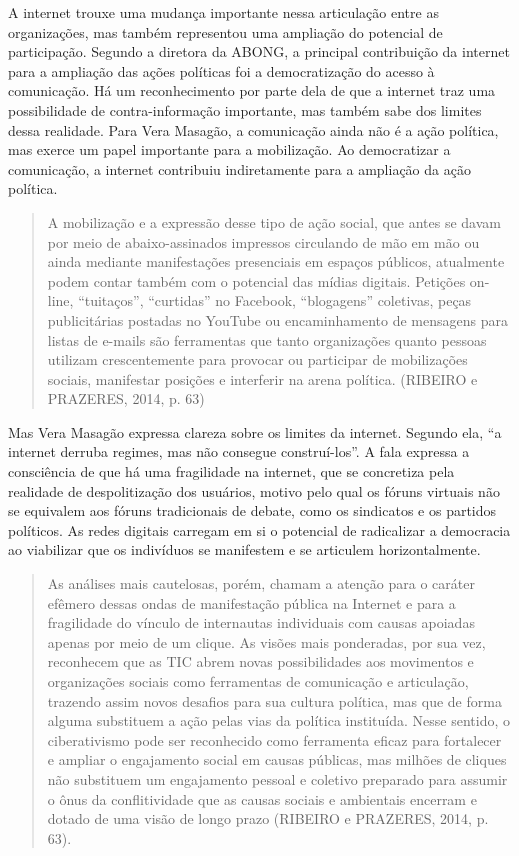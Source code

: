 A internet trouxe uma mudança importante nessa articulação entre as
organizações, mas também representou uma ampliação do potencial de
participação. Segundo a diretora da ABONG, a principal contribuição da
internet para a ampliação das ações políticas foi a democratização do
acesso à comunicação. Há um reconhecimento por parte dela de que a
internet traz uma possibilidade de contra-informação importante, mas
também sabe dos limites dessa realidade. Para Vera Masagão, a
comunicação ainda não é a ação política, mas exerce um papel importante
para a mobilização. Ao democratizar a comunicação, a internet contribuiu
indiretamente para a ampliação da ação política.

\begin{quote}
A mobilização e a expressão desse tipo de ação social, que antes se
davam por meio de abaixo-assinados impressos circulando de mão em mão ou
ainda mediante manifestações presenciais em espaços públicos, atualmente
podem contar também com o potencial das mídias digitais. Petições
on-line, ``tuitaços'', ``curtidas'' no Facebook, ``blogagens''
coletivas, peças publicitárias postadas no YouTube ou encaminhamento de
mensagens para listas de e-mails são ferramentas que tanto organizações
quanto pessoas utilizam crescentemente para provocar ou participar de
mobilizações sociais, manifestar posições e interferir na arena
política. (RIBEIRO e PRAZERES, 2014, p. 63)
\end{quote}

Mas Vera Masagão expressa clareza sobre os limites da internet. Segundo
ela, ``a internet derruba regimes, mas não consegue construí-los''. A
fala expressa a consciência de que há uma fragilidade na internet, que
se concretiza pela realidade de despolitização dos usuários, motivo pelo
qual os fóruns virtuais não se equivalem aos fóruns tradicionais de
debate, como os sindicatos e os partidos políticos. As redes digitais
carregam em si o potencial de radicalizar a democracia ao viabilizar que
os indivíduos se manifestem e se articulem horizontalmente.

\begin{quote}
As análises mais cautelosas, porém, chamam a atenção para o caráter
efêmero dessas ondas de manifestação pública na Internet e para a
fragilidade do vínculo de internautas individuais com causas apoiadas
apenas por meio de um clique. As visões mais ponderadas, por sua vez,
reconhecem que as TIC abrem novas possibilidades aos movimentos e
organizações sociais como ferramentas de comunicação e articulação,
trazendo assim novos desafios para sua cultura política, mas que de
forma alguma substituem a ação pelas vias da política instituída. Nesse
sentido, o ciberativismo pode ser reconhecido como ferramenta eficaz
para fortalecer e ampliar o engajamento social em causas públicas, mas
milhões de cliques não substituem um engajamento pessoal e coletivo
preparado para assumir o ônus da conflitividade que as causas sociais e
ambientais encerram e dotado de uma visão de longo prazo (RIBEIRO e
PRAZERES, 2014, p. 63).
\end{quote}

